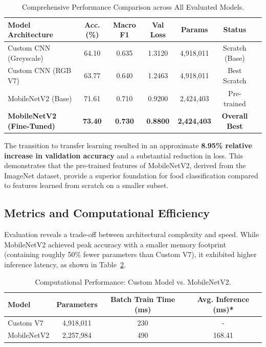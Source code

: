 \documentclass[a4paper,11pt]{article}
\begin{document}
\begin{table}[h]
\centering
\small
\setlength{\tabcolsep}{4pt}
\caption{Comprehensive Performance Comparison across All Evaluated Models.}
\label{tab:master_comparison}
\begin{tabular}{@{}lcccccr@{}}
\toprule
\textbf{Model Architecture} & \textbf{Acc. (\%)} & \textbf{Macro F1} & \textbf{Val Loss} & \textbf{Params} & \textbf{Status} \\ \midrule
Custom CNN (Greyscale) & 64.10 & 0.635 & 1.3120 & 4,918,011 & Scratch (Base) \\
Custom CNN (RGB V7) & 63.77 & 0.640 & 1.2463 & 4,918,011 & Best Scratch \\ \midrule
MobileNetV2 (Base) & 71.61 & 0.710 & 0.9200 & 2,424,403 & Pre-trained \\
\textbf{MobileNetV2 (Fine-Tuned)} & \textbf{73.40} & \textbf{0.730} & \textbf{0.8800} & \textbf{2,424,403} & \textbf{Overall Best} \\ \bottomrule
\end{tabular}
\end{table}

The transition to transfer learning resulted in an approximate \textbf{8.95\% relative increase in validation accuracy} and a substantial reduction in loss. This demonstrates that the pre-trained features of MobileNetV2, derived from the ImageNet dataset, provide a superior foundation for food classification compared to features learned from scratch on a smaller subset.

\subsection{Metrics and Computational Efficiency}
Evaluation reveals a trade-off between architectural complexity and speed. While MobileNetV2 achieved peak accuracy with a smaller memory footprint (containing roughly 50\% fewer parameters than Custom V7), it exhibited higher inference latency, as shown in Table~\ref{tab:metrics_comparison}.

\begin{table}[h]
\centering
\small
\caption{Computational Performance: Custom Model vs. MobileNetV2.}
\label{tab:metrics_comparison}
\begin{tabular}{@{}lccc@{}}
\toprule
\textbf{Model} & \textbf{Parameters} & \textbf{Batch Train Time (ms)} & \textbf{Avg. Inference (ms)*} \\ \midrule
Custom V7 & 4,918,011 & 230 & - \\
MobileNetV2 & 2,257,984 & 490 & 168.41 \\ \bottomrule
\end{tabular}
\end{table}
\end{document}
